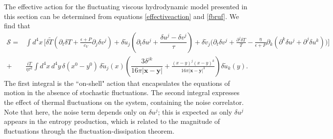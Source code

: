 \documentclass[a4paper, amsfonts, amssymb, amsmath, reprint, showkeys, nofootinbib, twoside,notitlepage,onecolumn]{revtex4-2}
\theoremstyle{definition}
\begin{document}
The effective action for the fluctuating viscous hydrodynamic model presented in this section can be determined from equations \eqref{effectiveaction} and \eqref{fbruf}. We find that
\begin{equation}\label{effezio}
\begin{split}
    \mathcal{S} = & \int d^4x \, \Bigg[ \delta \tilde{T} \left( \partial_t \delta T {+} \frac{\epsilon {+} P}{c_V} \partial_j \delta v^j \right) + \delta \tilde{u}_j \left( \partial_t \delta u^j {+} \dfrac{\delta u^j{-}\delta v^j}{\tau} \right) + \delta \tilde{v}_j \bigg( \partial_t \delta v^j {+} \frac{\partial^j \delta T}{T}  {-} \frac{\eta}{\epsilon + P} \partial_k\left( \partial^k  \delta u^j {+} \partial^j \delta u^k \right) \bigg) \Bigg] \\
    +& \frac{i T}{\eta \tau^2} \int  d^4x \, d^4y \, \delta (x^0 {-} y^0) \,  \delta \tilde{u}_j(x)  \left( \dfrac{3 \delta^{jk}}{16\pi |\textbf{x}-\textbf{y}|}  + \frac{(x-y)^j (x-y)^k}{16\pi |\textbf{x}-\textbf{y}|^3} \right) \delta \tilde{u}_k(y) .
\end{split}
\end{equation}
The first integral is the ``on-shell" action that encapsulates the equations of motion in the absence of stochastic fluctuations. The second integral expresses the effect of thermal fluctuations on the system, containing the noise correlator. Note that here, the noise term depends only on $\delta u^j$; this is expected as only $\delta u^j$ appears in the entropy production, which is related to the magnitude of fluctuations through the fluctuation-dissipation theorem. 
\end{document}
